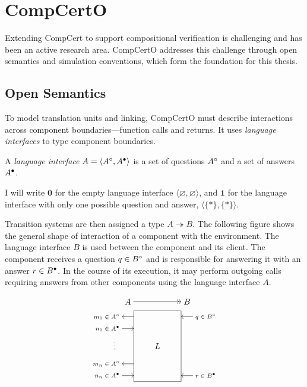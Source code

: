 \section{CompCertO}
\label{sec:bg:compcerto}

Extending CompCert to support compositional verification
is challenging and has been an active research area.
CompCertO\citep{compcerto} addresses this challenge
through open semantics and simulation conventions,
which form the foundation for this thesis.

\subsection{Open Semantics}
\label{sec:bg:language-interfaces}

To model translation units and linking,
CompCertO must describe interactions across component boundaries—function calls and returns.
It uses \emph{language interfaces}
to type component boundaries.

\begin{definition}
  A \emph{language interface} $A = \langle A^\circ, A^\bullet \rangle$
  is a set of questions $A^\circ$ and a set of answers $A^\bullet$.
\end{definition}
I will write $\mathbf{0}$
for the empty language interface $\langle \varnothing, \varnothing \rangle$,
and $\mathbf{1}$
for the language interface
with only one possible question and answer,
$\langle \{*\}, \{*\} \rangle$.

Transition systems
are then assigned a type $A \twoheadrightarrow B$.
The following figure
shows the general shape of interaction of a component
with the environment.
The language interface $B$
is used between the component and its client.
The component
receives a question $q \in B^\circ$
and is responsible for answering it
with an answer $r \in B^\bullet$.
In the course of its execution,
it may perform outgoing calls
requiring answers from other components
using the language interface $A$.

\[
  \centering
  \begin{tikzpicture}[yscale=0.25,xscale=0.50]
    \draw (1,-1) rectangle (5,11) node[midway] {$L$};
    \scriptsize
    \draw[<-] (0,10) node[left] {$m_1 \in A^\que$} -- (1,10)
    node[above=1.5em,midway] (B) {\normalsize $A$};
    \draw[<-] (5,10) -- (6,10) node[right] {$q \in B^\que$}
    node[above=1.5em,midway] (A) {\normalsize $B$};
    \draw[->] (0,8) node[left] {$n_1 \in A^\ans$} -- (1,8) ;
    \node[right] at (-1,5.5) {$\:\vdots$};
    \draw[<-] (0,2) node[left] {$m_n \in A^\que$} -- (1,2);
    \draw[->] (6,0) node[right] {$r \in B^\ans$} -- (5,0);
    \draw[<-] (1,0) -- (0,0) node[left] {$n_n \in A^\ans$};
    \draw[<<-] (A) -- (B);
  \end{tikzpicture}
\]


